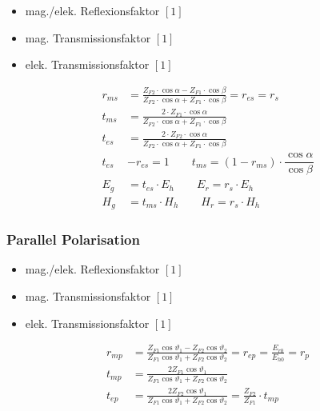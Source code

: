 \begin{itemize}
    \item mag./elek. Reflexionsfaktor $[1]$
    \item mag. Transmissionsfaktor $[1]$
    \item elek. Transmissionsfaktor $[1]$
\end{itemize}

\begin{align*}
    r_{m s} & = \frac{Z_{F 2} \cdot \cos \alpha-Z_{F 1} \cdot \cos \beta}{Z_{F 2} \cdot \cos \alpha+Z_{F 1} \cdot \cos \beta} = r_{e s} = r_{s} \\
    t_{m s} & = \frac{2 \cdot Z_{F 1} \cdot \cos \alpha}{Z_{F 2} \cdot \cos \alpha+Z_{F 1} \cdot \cos \beta}                                    \\
    t_{e s} & = \frac{2 \cdot Z_{F 2} \cdot \cos \alpha}{Z_{F 2} \cdot \cos \alpha+Z_{F 1} \cdot \cos \beta}                                    \\
    t_{e s} & -r_{e s}= 1 \qquad t_{m s} = (1 - r_{m s}) \cdot \dfrac{\cos \alpha}{\cos \beta}                                                  \\
    E_{g}   & = t_{e s} \cdot E_{h} \qquad E_{r} = r_{s} \cdot E_{h}                                                                            \\
    H_{g}   & = t_{m s} \cdot H_{h} \qquad H_{r} = r_{s} \cdot H_{h}
\end{align*}

\subsubsection{Parallel Polarisation}


\begin{itemize}
    \item mag./elek. Reflexionsfaktor $[1]$
    \item mag. Transmissionsfaktor $[1]$
    \item elek. Transmissionsfaktor $[1]$
\end{itemize}

\begin{align*}
    r_{m p} & = \frac{Z_{F 1} \cos \vartheta_{1}-Z_{F 2} \cos \vartheta_{2}}{Z_{F 1} \cos \vartheta_{1}+Z_{F 2} \cos \vartheta_{2}} = r_{e p} = \frac{E_{r 0}}{E_{h 0}} =r_{p} \\
    t_{m p} & = \frac{2 Z_{F 1} \cos \vartheta_{1}}{Z_{F 1} \cos \vartheta_{1}+Z_{F 2} \cos \vartheta_{2}}                                                                     \\
    t_{e p} & = \frac{2 Z_{F 2} \cos \vartheta_{1}}{Z_{F 1} \cos \vartheta_{1}+Z_{F 2} \cos \vartheta_{2}} = \frac{Z_{F 2}}{Z_{F 1}} \cdot t_{m p}
\end{align*}

